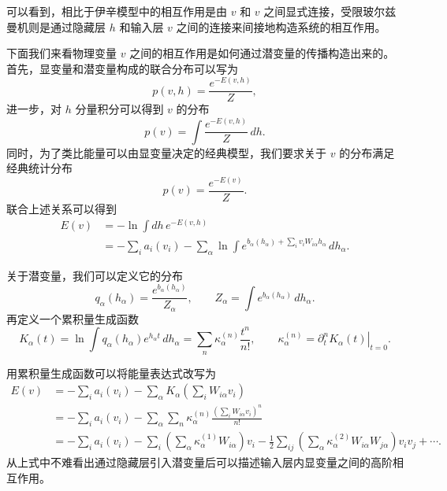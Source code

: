 可以看到，相比于伊辛模型中的相互作用是由 $v$ 和 $v$ 之间显式连接，受限玻尔兹曼机则是通过隐藏层 $h$ 和输入层 $v$ 之间的连接来间接地构造系统的相互作用。

下面我们来看物理变量 $v$ 之间的相互作用是如何通过潜变量的传播构造出来的。首先，显变量和潜变量构成的联合分布可以写为
\begin{equation}
p(v,h)=\frac{e^{-E(v,h)}}{Z},
\tag{8.3.27}
\end{equation}
进一步，对 $h$ 分量积分可以得到 $v$ 的分布
\begin{equation}
p(v)=\int\frac{e^{-E(v,h)}}{Z}\,dh.
\tag{8.3.28}
\end{equation}
同时，为了类比能量可以由显变量决定的经典模型，我们要求关于 $v$ 的分布满足经典统计分布
\begin{equation}
p(v)=\frac{e^{-E(v)}}{Z}.
\tag{8.3.29}
\end{equation}
联合上述关系可以得到
\begin{equation}
\begin{aligned}
E(v)&=-\ln\int dh\,e^{-E(v,h)}\\
&=-\sum_i a_i(v_i)-\sum_\alpha\ln\int e^{b_\alpha(h_\alpha)+\sum_i v_iW_{i\alpha}h_\alpha}\,dh_\alpha.
\end{aligned}
\tag{8.3.30}
\end{equation}

关于潜变量，我们可以定义它的分布
\begin{equation}
q_\alpha(h_\alpha)=\frac{e^{b_\alpha(h_\alpha)}}{Z_\alpha},\qquad Z_\alpha=\int e^{b_\alpha(h_\alpha)}\,dh_\alpha.
\tag{8.3.31}
\end{equation}
再定义一个累积量生成函数
\begin{equation}
K_\alpha(t)=\ln\int q_\alpha(h_\alpha)e^{h_\alpha t}\,dh_\alpha
=\sum_n\kappa_\alpha^{(n)}\frac{t^n}{n!},\qquad
\kappa_\alpha^{(n)}=\left.\partial_t^n K_\alpha(t)\right|_{t=0}.
\tag{8.3.32}
\end{equation}

用累积量生成函数可以将能量表达式改写为
\begin{equation}
\begin{aligned}
E(v)
&=-\sum_i a_i(v_i)-\sum_\alpha K_\alpha\!\left(\sum_iW_{i\alpha}v_i\right)\\
&=-\sum_i a_i(v_i)-\sum_\alpha\sum_n\kappa_\alpha^{(n)}
\frac{\left(\sum_iW_{i\alpha}v_i\right)^n}{n!}\\
&=-\sum_i a_i(v_i)-\sum_i\left(\sum_\alpha\kappa_\alpha^{(1)}W_{i\alpha}\right)v_i
-\frac12\sum_{ij}\left(\sum_\alpha\kappa_\alpha^{(2)}W_{i\alpha}W_{j\alpha}\right)v_iv_j+\cdots.
\end{aligned}
\tag{8.3.33}
\end{equation}
从上式中不难看出通过隐藏层引入潜变量后可以描述输入层内显变量之间的高阶相互作用。


